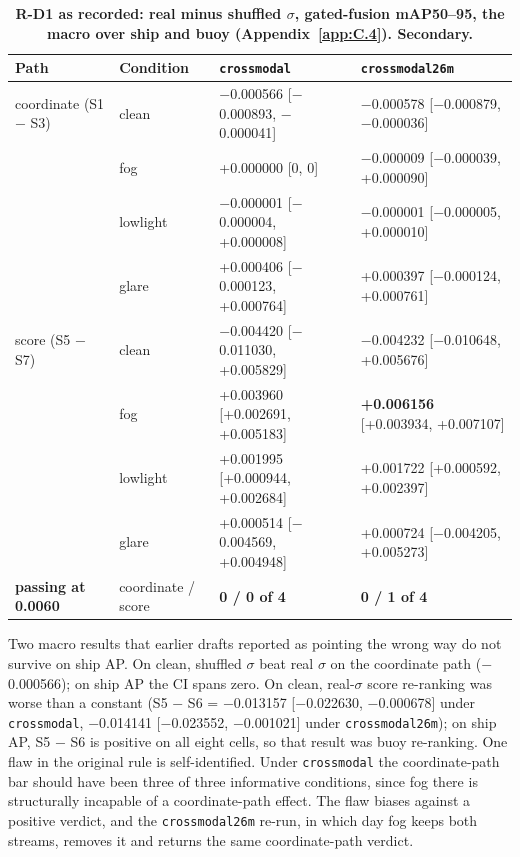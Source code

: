 \documentclass[10pt]{article}
\begin{document}
\begin{table}[htbp]
\centering
\small
\caption{\textbf{R-D1 as recorded: real minus shuffled $\sigma$, gated-fusion mAP50--95, the macro over ship and buoy (Appendix~\ref{app:C.4}). Secondary.}}
\label{tab:12}
\begin{tabularx}{\linewidth}{ll>{\raggedright\arraybackslash}X>{\raggedright\arraybackslash}X}
\toprule
Path & Condition & \texttt{crossmodal} & \texttt{crossmodal26m} \\
\midrule
coordinate (S1 $-$ S3) & clean & $-$0.000566 [$-$0.000893, $-$0.000041] & $-$0.000578 [$-$0.000879, $-$0.000036] \\
 & fog & +0.000000 [0, 0] & $-$0.000009 [$-$0.000039, +0.000090] \\
 & lowlight & $-$0.000001 [$-$0.000004, +0.000008] & $-$0.000001 [$-$0.000005, +0.000010] \\
 & glare & +0.000406 [$-$0.000123, +0.000764] & +0.000397 [$-$0.000124, +0.000761] \\
score (S5 $-$ S7) & clean & $-$0.004420 [$-$0.011030, +0.005829] & $-$0.004232 [$-$0.010648, +0.005676] \\
 & fog & +0.003960 [+0.002691, +0.005183] & \textbf{+0.006156} [+0.003934, +0.007107] \\
 & lowlight & +0.001995 [+0.000944, +0.002684] & +0.001722 [+0.000592, +0.002397] \\
 & glare & +0.000514 [$-$0.004569, +0.004948] & +0.000724 [$-$0.004205, +0.005273] \\
\textbf{passing at 0.0060} & coordinate / score & \textbf{0 / 0 of 4} & \textbf{0 / 1 of 4} \\
\bottomrule
\end{tabularx}
\end{table}
Two macro results that earlier drafts reported as pointing the wrong way do not survive on ship AP. On clean, shuffled $\sigma$ beat real $\sigma$ on the coordinate path ($-$0.000566); on ship AP the CI spans zero. On clean, real-$\sigma$ score re-ranking was worse than a constant (S5 $-$ S6 = $-$0.013157 [$-$0.022630, $-$0.000678] under \texttt{crossmodal}, $-$0.014141 [$-$0.023552, $-$0.001021] under \texttt{crossmodal26m}); on ship AP, S5 $-$ S6 is positive on all eight cells, so that result was buoy re-ranking. One flaw in the original rule is self-identified. Under \texttt{crossmodal} the coordinate-path bar should have been three of three informative conditions, since fog there is structurally incapable of a coordinate-path effect. The flaw biases against a positive verdict, and the \texttt{crossmodal26m} re-run, in which day fog keeps both streams, removes it and returns the same coordinate-path verdict.
\end{document}
